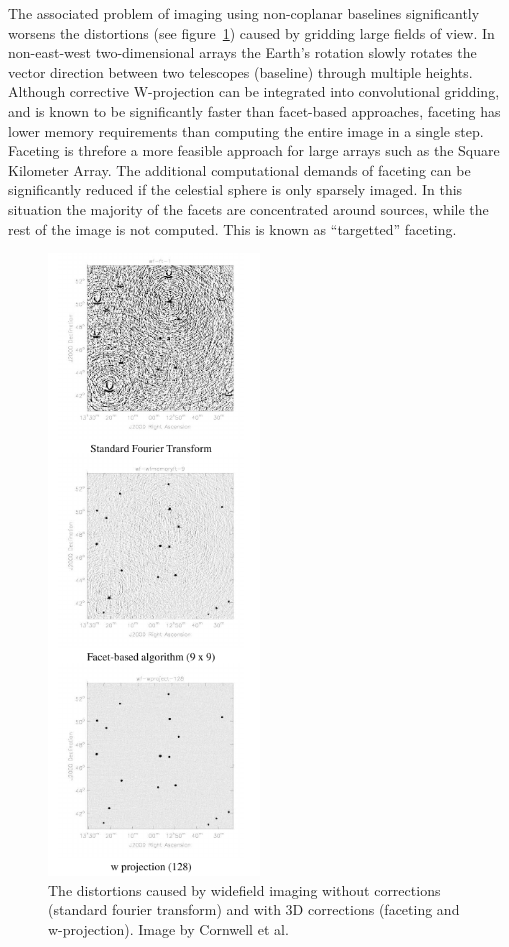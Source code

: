 \documentclass[a4paper, two column]{article}
\begin{document}
The associated problem of imaging using non-coplanar baselines significantly worsens the distortions (see figure~\ref{FIG_3D_DISTORTIONS}) caused by gridding large fields of view. In non-east-west two-dimensional arrays the 
Earth's rotation slowly rotates the vector direction between two telescopes (baseline) through multiple heights. Although corrective W-projection can be integrated into convolutional gridding, and is known to be significantly faster than facet-based approaches, faceting has lower memory requirements 
than computing the entire image in a single step. Faceting is threfore a more feasible approach for large arrays such as the Square Kilometer Array. The additional computational demands of faceting can be significantly reduced if the celestial sphere is only sparsely imaged. In this situation the majority
of the facets are concentrated around sources, while the rest of the image is not computed. This is known as ``targetted'' faceting.

\begin{figure}[h]
 \begin{mdframed}
 \centering
 \includegraphics[width=0.5\textwidth]{3d_correction.png}
 \caption{The distortions caused by widefield imaging without corrections (standard fourier transform) and with 3D corrections (faceting and w-projection). Image by Cornwell et al. \cite{1416440}}
  \label{FIG_3D_DISTORTIONS}
 \end{mdframed}
\end{figure}
\end{document}
